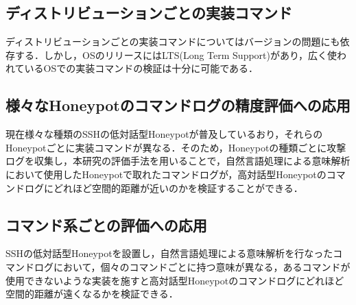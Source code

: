 \subsection{ディストリビューションごとの実装コマンド}
ディストリビューションごとの実装コマンドについてはバージョンの問題にも依存する．しかし，OSのリリースにはLTS(Long Term Support)があり，広く使われているOSでの実装コマンドの検証は十分に可能である．

\subsection{様々なHoneypotのコマンドログの精度評価への応用}
現在様々な種類のSSHの低対話型Honeypotが普及しているおり，それらのHoneypotごとに実装コマンドが異なる．そのため，Honeypotの種類ごとに攻撃ログを収集し，本研究の評価手法を用いることで，自然言語処理による意味解析において使用したHoneypotで取れたコマンドログが，高対話型Honeypotのコマンドログにどれほど空間的距離が近いのかを検証することができる．

\subsection{コマンド系ごとの評価への応用}
SSHの低対話型Honeypotを設置し，自然言語処理による意味解析を行なったコマンドログにおいて，個々のコマンドごとに持つ意味が異なる，あるコマンドが使用できないような実装を施すと高対話型Honeypotのコマンドログにどれほど空間的距離が遠くなるかを検証できる．

